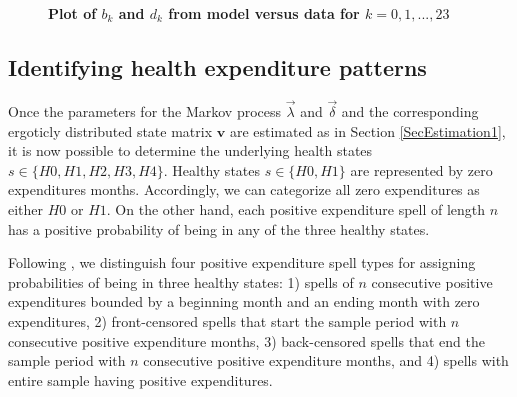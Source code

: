 \documentclass[letterpaper,12pt]{article}
\theoremstyle{definition}
\begin{document}
\begin{spacing}{1.5}{}
  \begin{figure}[h!]\centering \captionsetup{width=4.0in}
    \caption{\label{Figbkdk}\textbf{Plot of $b_k$ and $d_k$ from model versus data for $k = 0, 1, ..., 23$}}
  \end{figure}

\subsection{Identifying health expenditure patterns}\label{SecEstimation2}

  Once the parameters for the Markov process $\vec{\lambda}$ and $\vec{\delta}$ and the corresponding ergoticly distributed state matrix $\textbf{v}$ are estimated as in Section \ref{SecEstimation1}, it is now possible to determine the underlying health states $s \in \{H0, H1, H2, H3, H4\}$. Healthy states $s \in \{H0, H1\}$ are represented by zero expenditures months. Accordingly, we can categorize all zero expenditures as either $H0$ or $H1$. On the other hand, each positive expenditure spell of length $n$ has a positive probability of being in any of the three healthy states.\par
  
  Following \citet{evans}, we distinguish four positive expenditure spell types for assigning probabilities of being in three healthy states: 1) spells of $n$ consecutive positive expenditures bounded by a beginning month and an ending month with zero expenditures, 2) front-censored spells that start the sample period with $n$ consecutive positive expenditure months, 3) back-censored spells that end the sample period with $n$ consecutive positive expenditure months, and 4) spells with entire sample having positive expenditures.\par
  

\end{spacing}
\end{document}
